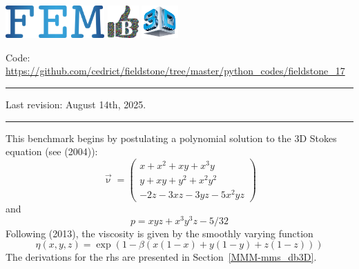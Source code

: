 \includegraphics[height=1.25cm]{images/pictograms/FEM}
\includegraphics[height=1.25cm]{images/pictograms/benchmark}
\includegraphics[height=1.25cm]{images/pictograms/3d}


%

\begin{center}
\inpython
{\small Code: \url{https://github.com/cedrict/fieldstone/tree/master/python_codes/fieldstone_17}}
\end{center}

\par\noindent\rule{\textwidth}{0.4pt}

Last revision: August 14th, 2025.

\par\noindent\rule{\textwidth}{0.4pt}



This benchmark begins by postulating a polynomial solution to the 3D Stokes 
equation (see \textcite{dobo04} (2004)):
\begin{equation}
\vec{\upnu}
=
\left(
\begin{array}{c}
x+x^2+xy+x^3y \\
y + xy + y^2 + x^2 y^2\\
-2z - 3xz - 3yz - 5x^2 yz
\end{array}
\right)
\label{eqburrr}
\end{equation}
and
\begin{equation}
p = xyz + x^3 y^3z - 5/32
\end{equation}
Following \textcite{busa13} (2013), the viscosity
is given by the smoothly varying function
\begin{equation}
\eta(x,y,z)=\exp(1 - \beta(x(1 - x) + y(1 - y) + z(1 - z)))
\end{equation}
The derivations for the rhs are presented in Section~\ref{MMM-mms_db3D}.



